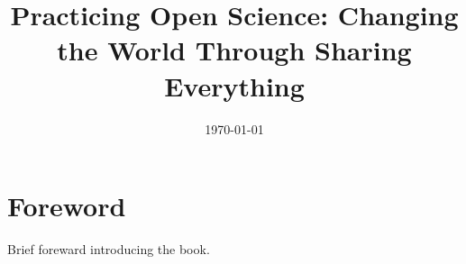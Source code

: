 \documentclass[letterpaper,10pt]{book}
\title{\textbf{Practicing Open Science:
Changing the World Through Sharing Everything}}
\date{\today}
\begin{document}
\maketitle

\newpage

\tableofcontents

\newpage

\section*{Foreword}

Brief foreward introducing the book.




\end{document}
